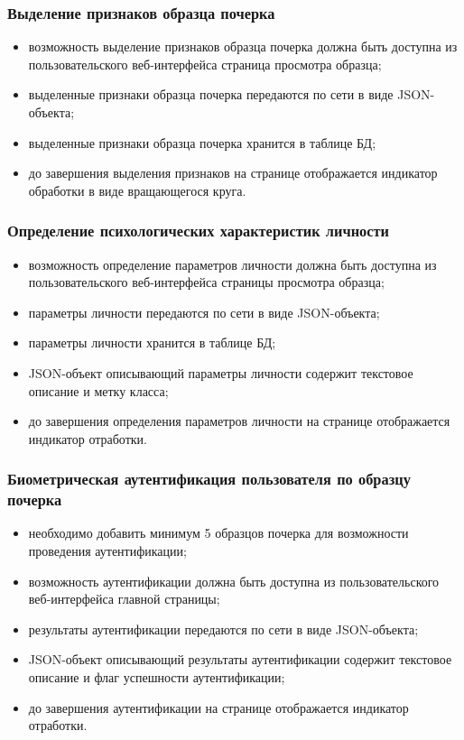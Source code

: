 \subsubsection{Выделение признаков образца почерка}
\label{sec:freq:extract_features}
\begin{itemize}
	\item возможность выделение признаков образца почерка должна быть доступна из пользовательского веб-интерфейса страница просмотра образца;
	\item выделенные признаки образца почерка передаются по сети в виде JSON-объекта;
	\item выделенные признаки образца почерка хранится в таблице БД;
	\item до завершения выделения признаков на странице отображается индикатор обработки в виде вращающегося круга.
\end{itemize}

\subsubsection{Определение психологических характеристик личности}
\label{sec:freq:psiho_analysis}
\begin{itemize}
	\item возможность определение параметров личности должна быть доступна из пользовательского веб-интерфейса страницы просмотра образца;
	\item параметры личности передаются по сети в виде JSON-объекта;
	\item параметры личности хранится в таблице БД;
	\item JSON-объект описывающий параметры личности содержит текстовое описание и метку класса;
	\item до завершения определения параметров личности на странице отображается индикатор отработки.
\end{itemize}

\subsubsection{Биометрическая аутентификация пользователя по образцу почерка}
\label{sec:freq:identification}
\begin{itemize}
	\item необходимо добавить минимум 5 образцов почерка для возможности проведения аутентификации;
	\item возможность аутентификации должна быть доступна из пользовательского веб-интерфейса главной страницы;
	\item результаты аутентификации передаются по сети в виде JSON-объекта;
	\item JSON-объект описывающий результаты аутентификации содержит текстовое описание и флаг успешности аутентификации;
	\item до завершения аутентификации на странице отображается индикатор отработки.
\end{itemize}

